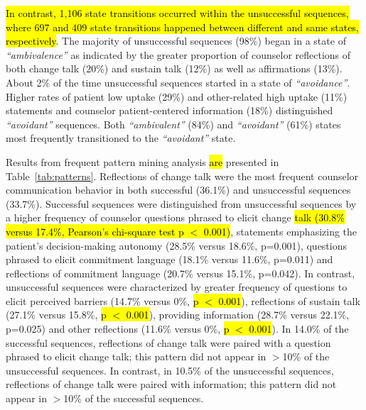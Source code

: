 \documentclass[smallextended]{svjour3}       %
\begin{document}
\hl{In contrast, 1,106 state transitions occurred within the unsuccessful sequences, where 697 and 409 state transitions happened between different and same states, respectively}. The majority of unsuccessful sequences (98\%) began in a state of \textit{``ambivalence''} as indicated by the greater proportion of counselor reflections of both change talk (20\%) and sustain talk (12\%) as well as affirmations (13\%). About 2\% of the time unsuccessful sequences started in a state of \textit{``avoidance''}. Higher rates of patient low uptake (29\%) and other-related high uptake (11\%) statements and counselor patient-centered information (18\%) distinguished \textit{``avoidant''} sequences. Both \textit{``ambivalent''} (84\%) and \textit{``avoidant''} (61\%) states most frequently transitioned to the \textit{``avoidant''} state.

Results from frequent pattern mining analysis \hl{are} presented in Table~\ref{tab:patterns}. Reflections of change talk were the most frequent counselor communication behavior in both successful (36.1\%) and unsuccessful sequences (33.7\%). Successful sequences were distinguished from unsuccessful sequences by a higher frequency of counselor questions phrased to elicit change \hl{talk (30.8\% versus 17.4\%, Pearson's chi-square test p $<$ 0.001)}, statements emphasizing the patient's decision-making autonomy (28.5\% versus 18.6\%, p=0.001), questions phrased to elicit commitment language (18.1\% versus 11.6\%, p=0.011) and reflections of commitment language (20.7\% versus 15.1\%, p=0.042). In contrast, unsuccessful sequences were characterized by greater frequency of questions to elicit perceived barriers (14.7\% versus 0\%, \hl{p $<$ 0.001}), reflections of sustain talk (27.1\% versus 15.8\%, \hl{p $<$ 0.001}), providing information (28.7\% versus 22.1\%, p=0.025) and other reflections (11.6\% versus 0\%, \hl{p $<$ 0.001}). In 14.0\% of the successful sequences, reflections of change talk were paired with a question phrased to elicit change talk; this pattern did not appear in $>$10\% of the unsuccessful sequences. In contrast, in 10.5\% of the unsuccessful sequences, reflections of change talk were paired with information; this pattern did not appear in $>$10\% of the successful sequences.
\end{document}
